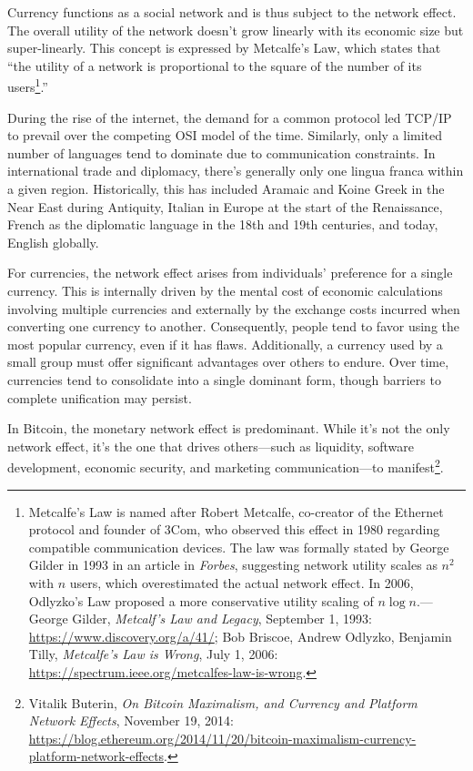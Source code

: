 \documentclass[
  a5paper,
  smalldemyvopaper,10pt,twoside,onecolumn,openright,extrafontsizes,hidelinks]{memoir}
\begin{document}
Currency functions as a social network and is thus subject to the
network effect. The overall utility of the network doesn't grow linearly
with its economic size but super-linearly. This concept is expressed by
Metcalfe's Law, which states that ``the utility of a network is
proportional to the square of the number of its users\footnote{Metcalfe's
  Law is named after Robert Metcalfe, co-creator of the Ethernet
  protocol and founder of 3Com, who observed this effect in 1980
  regarding compatible communication devices. The law was formally
  stated by George Gilder in 1993 in an article in \emph{Forbes},
  suggesting network utility scales as \(n^2\) with \(n\) users, which
  overestimated the actual network effect. In 2006, Odlyzko's Law
  proposed a more conservative utility scaling of \(n \log n\).---George
  Gilder, \emph{Metcalf's Law and Legacy}, September 1, 1993:
  \url{https://www.discovery.org/a/41/}; Bob Briscoe, Andrew Odlyzko,
  Benjamin Tilly, \emph{Metcalfe's Law is Wrong}, July 1, 2006:
  \url{https://spectrum.ieee.org/metcalfes-law-is-wrong}.}.''

During the rise of the internet, the demand for a common protocol led
TCP/IP to prevail over the competing OSI model of the time. Similarly,
only a limited number of languages tend to dominate due to communication
constraints. In international trade and diplomacy, there's generally
only one lingua franca within a given region. Historically, this has
included Aramaic and Koine Greek in the Near East during Antiquity,
Italian in Europe at the start of the Renaissance, French as the
diplomatic language in the 18th and 19th centuries, and today, English
globally.

For currencies, the network effect arises from individuals' preference
for a single currency. This is internally driven by the mental cost of
economic calculations involving multiple currencies and externally by
the exchange costs incurred when converting one currency to another.
Consequently, people tend to favor using the most popular currency, even
if it has flaws. Additionally, a currency used by a small group must
offer significant advantages over others to endure. Over time,
currencies tend to consolidate into a single dominant form, though
barriers to complete unification may persist.

In Bitcoin, the monetary network effect is predominant. While it's not
the only network effect, it's the one that drives others---such as
liquidity, software development, economic security, and marketing
communication---to manifest\footnote{Vitalik Buterin, \emph{On Bitcoin
  Maximalism, and Currency and Platform Network Effects}, November 19,
  2014:
  \url{https://blog.ethereum.org/2014/11/20/bitcoin-maximalism-currency-platform-network-effects}.}.
\end{document}
